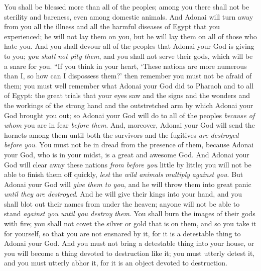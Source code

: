 \begin{biblechapter}
\verse You shall be blessed more than all of the peoples; among you there shall not be sterility and bareness, even among domestic animals.
\verse And Adonai will turn away from you all the illness and all the harmful diseases of Egypt that you experienced; he will not lay them on you, but he will lay them on all of those who hate you.
\verse And you shall devour all of the peoples that Adonai your God is giving to you; \textit{you shall not pity them}, and you shall not serve their gods, which will be a snare for you.
\verse “If you think in your heart, ‘These nations are more numerous than I, so how can I dispossess them?’
\verse then remember you must not be afraid of them; you must well remember what Adonai your God did to Pharaoh and to all of Egypt:
\verse the great trials that your eyes saw and the signs and the wonders and the workings of the strong hand and the outstretched arm by which Adonai your God brought you out; so Adonai your God will do to all of the peoples \textit{because of whom} you are in fear \textit{before them}.
\verse And, moreover, Adonai your God will send the hornets among them until both the survivors and the fugitives \textit{are destroyed} \textit{before you}.
\verse You must not be in dread from the presence of them, because Adonai your God, who is in your midst, is a great and awesome God.
\verse And Adonai your God will clear away these nations \textit{from before you} little by little; you will not be able to finish them off quickly, \textit{lest} the \textit{wild animals} \textit{multiply} \textit{against you}.
\verse But Adonai your God will \textit{give them to you}, and he will throw them into great panic \textit{until they are destroyed}.
\verse And he will give their kings into your hand, and you shall blot out their names from under the heaven; anyone will not be able to stand \textit{against you} \textit{until you destroy them}.
\verse You shall burn the images of their gods with fire; you shall not covet the silver or gold that is on them, and so you take it for yourself, so that you are not ensnared by it, for it is a detestable thing to Adonai your God.
\verse And you must not bring a detestable thing into your house, or you will become a thing devoted to destruction like it; you must utterly detest it, and you must utterly abhor it, for it is an object devoted to destruction.
\end{biblechapter}

